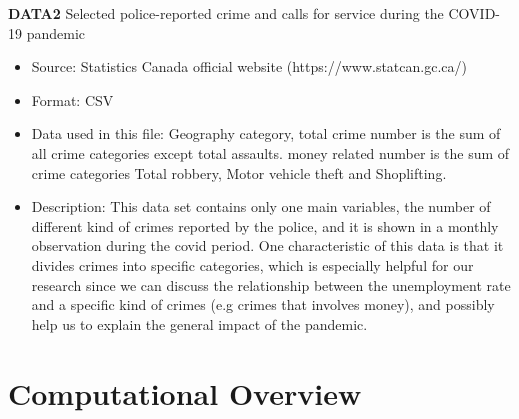 \documentclass[fontsize=11pt]{article}
\begin{document}
\textbf{DATA2} Selected police-reported crime and calls for service during the COVID-19 pandemic
\begin{itemize}
\item Source: Statistics Canada official website (https://www.statcan.gc.ca/)
\item Format: CSV
\item Data used in this file: Geography category, total crime number is the sum of all crime categories except total assaults. money related number is the sum of crime categories Total robbery, Motor vehicle theft and Shoplifting.
\item Description: This data set contains only one main variables, the number of different kind of crimes reported by the police, and it is shown in a monthly observation during the covid period. One characteristic of this data is that it divides crimes into specific categories, which is especially helpful for our research since we can discuss the relationship between the unemployment rate and a specific kind of crimes (e.g crimes that involves money), and possibly help us to explain the general impact of the pandemic.
\end{itemize}

\section*{Computational Overview}
\end{document}
